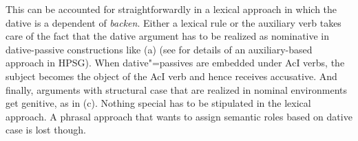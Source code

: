 \zl
This can be accounted for straightforwardly in a lexical approach in which the dative is a dependent
of \emph{backen}. Either a lexical rule or the auxiliary verb takes care of the fact that the dative
argument has to be realized as nominative in dative-passive constructions like (a) (see
 for details of an auxiliary-based approach in HPSG). When
dative"=passives are embedded under AcI verbs, the subject becomes the object of the AcI verb and
hence receives accusative. And finally, arguments with structural case that are realized in nominal
environments get genitive, as in (c). Nothing special has to be stipulated in the lexical
approach.
A phrasal approach that wants to assign semantic roles based on dative case is lost though.

